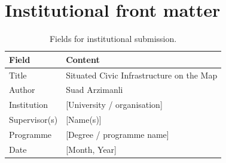 \documentclass[12pt,a4paper]{article}
\begin{document}
\section{Institutional front matter}
\label{app:frontmatter}

\begin{table}[htbp]
\centering
\caption{Fields for institutional submission.}
\begin{tabular}{@{}ll@{}}
\toprule
\textbf{Field} & \textbf{Content} \\
\midrule
Title & Situated Civic Infrastructure on the Map \\
Author & Suad Arzimanli \\
Institution & [University / organisation] \\
Supervisor(s) & [Name(s)] \\
Programme & [Degree / programme name] \\
Date & [Month, Year] \\
\bottomrule
\end{tabular}
\end{table}
\end{document}
